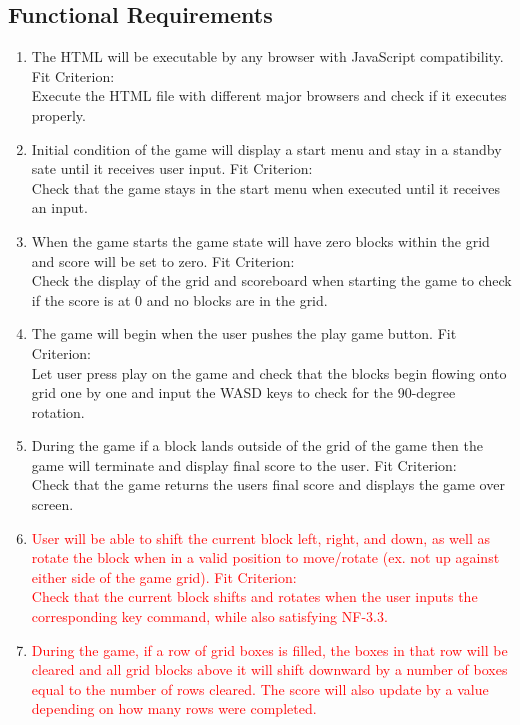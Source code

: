 \documentclass[12pt, titlepage]{article}
\begin{document}
\subsection{Functional Requirements}
\begin{enumerate}
    \item
    The HTML will be executable by any browser with JavaScript compatibility.    \subitem
    Fit Criterion: \\
    Execute the HTML file with different major browsers and check if it executes properly.    
    \item
    Initial condition of the game will display a start menu and stay in a standby sate until it receives user input.    \subitem
    Fit Criterion: \\
    Check that the game stays in the start menu when executed until it receives an input.    
    \item
    When the game starts the game state will have zero blocks within the grid and score will be set to zero.    \subitem
    Fit Criterion: \\
    Check the display of the grid and scoreboard when starting the game to check if the score is at 0 and no blocks are in the grid.    
    \item
    The game will begin when the user pushes the play game button.    \subitem
    Fit Criterion: \\
    Let user press play on the game and check that the blocks begin flowing onto grid one by one and input the WASD keys to check for the 90-degree rotation.    
    \item
    During the game if a block lands outside of the grid of the game then the game will terminate and display final score to the user.    \subitem
    Fit Criterion: \\
    Check that the game returns the users final score and displays the game over screen.
    \item
    \textcolor{red}{User will be able to shift the current block left, right, and down, as well as rotate the block when in a valid position to move/rotate (ex. not up against either side of the game grid).}    \subitem
    \textcolor{red}{Fit Criterion:} \\
    \textcolor{red}{Check that the current block shifts and rotates when the user inputs the corresponding key command, while also satisfying NF-3.3.}
    \item
    \textcolor{red}{During the game, if a row of grid boxes is filled, the boxes in that row will be cleared and all grid blocks above it will shift downward by a number of boxes equal to the number of rows cleared. The score will also update by a value depending on how many rows were completed.}    \subitem

\end{enumerate}
\end{document}
